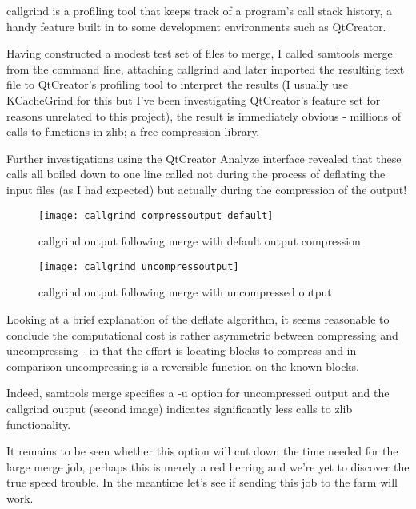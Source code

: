 callgrind is a profiling tool that keeps track of a program’s call stack
history, a handy feature built in to some development environments such as
QtCreator.

Having constructed a modest test set of files to merge, I called samtools merge
from the command line, attaching callgrind and later imported the resulting
text file to QtCreator’s profiling tool to interpret the results (I usually use
KCacheGrind for this but I’ve been investigating QtCreator’s feature set for
reasons unrelated to this project), the result is immediately obvious -
millions of calls to functions in zlib; a free compression library.

Further investigations using the QtCreator Analyze interface revealed that
these calls all boiled down to one line called not during the process of
deflating the input files (as I had expected) but actually during the
compression of the output!

\begin{figure}[htbp!]
    \centering
    \texttt{[image: callgrind\_compressoutput\_default]}
    \caption[callgrind-default]{callgrind output following merge with default
    output compression}
    \label{fig:callgrind-default}
\end{figure}

\begin{figure}[htbp!]
    \centering
    \texttt{[image: callgrind\_uncompressoutput]}
    \caption[callgrind-uncompressed]{callgrind output following merge with
    uncompressed output}
    \label{fig:callgrind-uncompressed}
\end{figure}

Looking at a brief explanation of the deflate algorithm, it seems reasonable to
conclude the computational cost is rather asymmetric between compressing and
uncompressing - in that the effort is locating blocks to compress and in
comparison uncompressing is a reversible function on the known blocks.

Indeed, samtools merge specifies a -u option for uncompressed output and the
callgrind output (second image) indicates significantly less calls to zlib
functionality.

It remains to be seen whether this option will cut down the time needed for the
large merge job, perhaps this is merely a red herring and we’re yet to discover
the true speed trouble. In the meantime let’s see if sending this job to the
farm will work.


